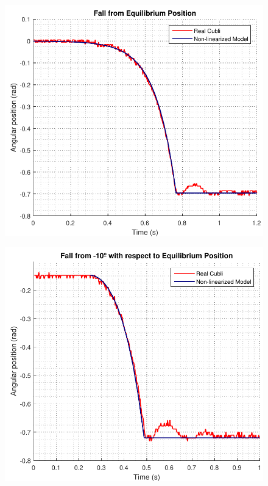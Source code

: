 \begin{minipage}{\linewidth}
	\begin{minipage}{0.45\linewidth}
		\begin{figure}[H]
			\includegraphics[scale=.48]{figures/FallTestComparison}
			\centering
			\captionsetup{justification=centering}
			\label{FallTestComparison}
		\end{figure}\vspace{-5mm}
	\end{minipage}
	\hspace{0.03\linewidth}
	\begin{minipage}{0.45\linewidth}
		\begin{figure}[H]
			\includegraphics[scale=.48]{figures/FallTestComparison10deg}

\end{figure}
\end{minipage}
\end{minipage}
